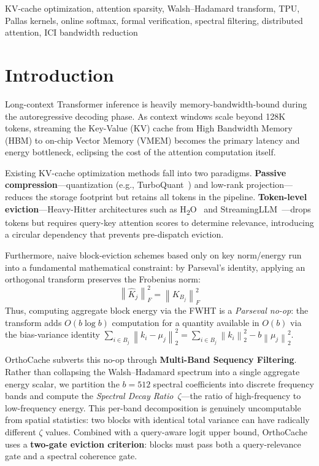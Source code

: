\documentclass[conference,10pt]{IEEEtran}
\newcommand{\norm}[1]{\left\|#1\right\|}
\begin{document}
\begin{IEEEkeywords}
KV-cache optimization, attention sparsity, Walsh--Hadamard transform, TPU,
Pallas kernels, online softmax, formal verification, spectral filtering,
distributed attention, ICI bandwidth reduction
\end{IEEEkeywords}

\section{Introduction}\label{sec:intro}

Long-context Transformer inference is heavily memory-bandwidth-bound during the
autoregressive decoding phase. As context windows scale beyond 128K tokens,
streaming the Key-Value (KV) cache from High Bandwidth Memory (HBM) to on-chip
Vector Memory (VMEM) becomes the primary latency and energy bottleneck,
eclipsing the cost of the attention computation itself.

Existing KV-cache optimization methods fall into two paradigms.
\textbf{Passive compression}---quantization (e.g., TurboQuant~\cite{turboquant})
and low-rank projection---reduces the storage footprint but retains all tokens
in the pipeline.
\textbf{Token-level eviction}---Heavy-Hitter architectures such as
H\textsubscript{2}O~\cite{h2o} and StreamingLLM~\cite{streamingllm}---drops
tokens but requires query-key attention scores to determine relevance,
introducing a circular dependency that prevents pre-dispatch eviction.

Furthermore, naive block-eviction schemes based only on key norm/energy run
into a fundamental mathematical constraint: by Parseval's identity, applying an
orthogonal transform preserves the Frobenius norm:
\begin{equation}\label{eq:parseval}
    \norm{\hat{K}_j}_F^2 = \norm{K_{B_j}}_F^2
\end{equation}
Thus, computing aggregate block energy via the FWHT is a \emph{Parseval no-op}:
the transform adds $O(b \log b)$ computation for a quantity available in $O(b)$
via the bias-variance identity
$\sum_{i \in B_j} \norm{k_i - \mu_j}_2^2 = \sum_{i \in B_j} \norm{k_i}_2^2 - b\norm{\mu_j}_2^2$.

OrthoCache subverts this no-op through \textbf{Multi-Band Sequency Filtering}.
Rather than collapsing the Walsh--Hadamard spectrum into a single aggregate
energy scalar, we partition the $b = 512$ spectral coefficients into discrete
frequency bands and compute the \emph{Spectral Decay Ratio}~$\zeta$---the ratio
of high-frequency to low-frequency energy. This per-band decomposition is
genuinely uncomputable from spatial statistics: two blocks with identical total
variance can have radically different $\zeta$ values. Combined with a
query-aware logit upper bound, OrthoCache uses a \textbf{two-gate eviction
criterion}: blocks must pass both a query-relevance gate and a spectral
coherence gate.
\end{document}
